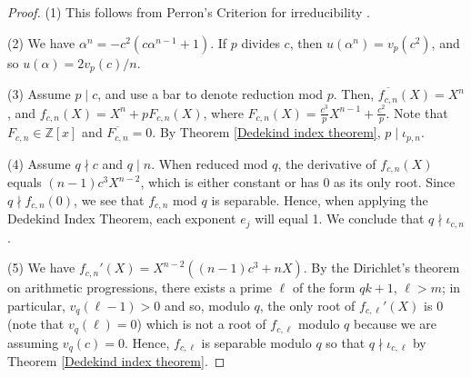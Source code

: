 \documentclass{article}
\theoremstyle{definition}\newtheorem{Def}[equation]{Definition}
\theoremstyle{definition}\newtheorem{Ques}[equation]{Question}
\theoremstyle{definition}\newtheorem{Conj}[equation]{Conjecture}
\theoremstyle{definition}\newtheorem{Not}[equation]{Notation}
\newcommand{\Z}{\mathbb{Z}}
\numberwithin{equation}{section}
\begin{document}
\begin{proof}
(1) This follows from Perron's Criterion for irreducibility \cite[Theorem 2.2.5]{Pra}.

(2) We have $\alpha^n = -c^2(c\alpha^{n-1}+1)$. If $p$ divides $c$, then $u(\alpha^n) = v_p(c^2)$, and so $u(\alpha) = 2v_p(c)/n$.

(3) Assume $p \mid c$, and use a bar to denote reduction mod $p$. Then, $\overline{f_{c,n}}(X) = X^n$, and $f_{c,n}(X) = X^n + pF_{c,n}(X)$, where $F_{c,n}(X) = \tfrac{c^3}{p}X^{n-1} + \tfrac{c^2}{p}$. Note that $F_{c,n} \in \Z[x]$ and $\overline{F_{c,n}}= 0$. By Theorem \ref{Dedekind index theorem}, $p \mid \iota_{p,n}$.

(4) Assume $q \nmid c$ and $q \mid n$. When reduced mod $q$, the derivative of $f_{c,n}(X)$ equals $(n-1)c^3X^{n-2}$, which is either constant or has 0 as its only root. Since $q \nmid f_{c,n}(0)$, we see that $f_{c,n}$ mod $q$ is separable. Hence, when applying the Dedekind Index Theorem, each exponent $e_j$ will equal 1. We conclude that $q \nmid \iota_{c,n}$.

(5) We have $f_{c,n}'(X)=X^{n-2}((n-1)c^3+nX)$. By the Dirichlet's theorem on arithmetic progressions, there exists a prime $\ell$ of the form $qk+1$, $\ell>m$; in particular,  $v_q(\ell-1)>0$ and so, modulo $q$, the only root of $f_{c,\ell}'(X)$ is $0$ (note that $v_q(\ell)=0$) which is not a root of $f_{c,\ell}$ modulo $q$ because we are assuming $v_q(c)=0$. Hence, $f_{c,\ell}$ is separable modulo $q$ so that $q\nmid\iota_{c,\ell}$ by Theorem \ref{Dedekind index theorem}.
\end{proof}
\end{document}
